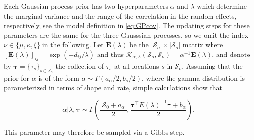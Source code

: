 \documentclass[11pt,english]{article}
\newcommand{\bs}[1]{\boldsymbol{#1}}
\newcommand{\mc}[1]{\mathcal{#1}}
\newcommand{\bl}{\begin{linenomath}}
\newcommand{\el}{\end{linenomath}}
\begin{document}
Each Gaussian process prior has two hyperparameters $\alpha$ and $\lambda$ which determine the marginal variance and the range of the correlation in the random effects, respectively, see the model definition in \eqref{eq:GPcov}.  The updating steps for these parameters are the same for the three Gausssian processes, so we omit the index $\nu \in \{ \mu, \kappa, \xi\}$ in the following.  Let $\bs{E}(\lambda)$ be the $|\mc{S}_o| \times |\mc{S}_o|$ matrix where $[\bs{E}(\lambda)]_{ij} = \exp(-d_{ij}/\lambda)$ and thus $\mc{K}_{\alpha,\lambda}(\mc{S}_o, \mc{S}_o) = \alpha^{-1}\bs{E}(\lambda)$, and denote by $\bs{\tau} = \{ \tau_s\}_{s \in \mc{S}_o}$ the collection of $\tau_s$ at all locations $s$  in $\mc{S}_o$.  Assuming that the prior for $\alpha$ is of the form $\alpha \sim \Gamma(a_\alpha/2,b_\alpha/2)$, where the gamma distribution is parameterized in terms of shape and rate, simple calculations show that 
\bl\[
\alpha |\lambda, \bs{\tau} \sim \Gamma\left(\frac{|\mc{S}_0 + a_\alpha|}{2}, \frac{\bs{\tau}^\top E(\lambda)^{-1}\bs{\tau} + b_\alpha}{2}\right). 
\]\el
This parameter may therefore be sampled via a Gibbs step.
\end{document}
